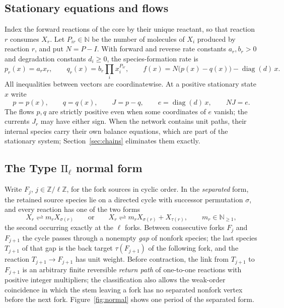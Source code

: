\documentclass[11pt,a4paper]{article}
\theoremstyle{plain}
\theoremstyle{definition}
\theoremstyle{remark}
\numberwithin{equation}{section}
\newcommand{\N}{\mathbb{N}}
\newcommand{\Z}{\mathbb{Z}}
\newcommand{\diag}{\operatorname{diag}}
\newcommand{\II}{\mathrm{II}}
\begin{document}
\subsection{Stationary equations and flows}
Index the forward reactions of the core by their unique reactant, so that reaction $r$ consumes $X_r$. Let $P_{ir}\in\N$ be the number of molecules of $X_i$ produced by reaction $r$, and put $N=P-I$. With forward and reverse rate constants $a_r,b_r>0$ and degradation constants $d_i\ge0$, the species-formation rate is
\begin{equation}\label{eq:model}
p_r(x)=a_rx_r,\qquad q_r(x)=b_r\prod_ix_i^{P_{ir}},\qquad
f(x)=N\bigl(p(x)-q(x)\bigr)-\diag(d)\,x .
\end{equation}
All inequalities between vectors are coordinatewise. At a positive stationary state $x$ write
\begin{equation}\label{eq:flows}
p=p(x),\qquad q=q(x),\qquad J=p-q,\qquad e=\diag(d)\,x,\qquad NJ=e .
\end{equation}
The flows $p,q$ are strictly positive even when some coordinates of $e$ vanish; the currents $J_r$ may have either sign. When the network contains unit paths, their internal species carry their own balance equations, which are part of the stationary system; Section~\ref{sec:chains} eliminates them exactly.

\subsection{The Type \texorpdfstring{$\II_\ell$}{II\_l} normal form}\label{subsec:typeii}
Write $F_j$, $j\in\Z/\ell\Z$, for the fork sources in cyclic order. In the \emph{separated} form, the retained source species lie on a directed cycle with successor permutation $\sigma$, and every reaction has one of the two forms
\begin{equation}\label{eq:ii}
X_r\rightleftharpoons m_rX_{\sigma(r)}
\qquad\text{or}\qquad
X_r\rightleftharpoons m_rX_{\sigma(r)}+X_{\tau(r)},\qquad m_r\in\N_{\ge1},
\end{equation}
the second occurring exactly at the $\ell$ forks. Between consecutive forks $F_j$ and $F_{j+1}$ the cycle passes through a nonempty \emph{gap} of nonfork species; the last species $T_{j+1}$ of that gap is the back target $\tau(F_{j+1})$ of the following fork, and the reaction $T_{j+1}\to F_{j+1}$ has unit weight. Before contraction, the link from $T_{j+1}$ to $F_{j+1}$ is an arbitrary finite reversible \emph{return path} of one-to-one reactions with positive integer multipliers; the classification also allows the weak-order coincidence in which the stem leaving a fork has no separated nonfork vertex before the next fork. Figure~\ref{fig:normal} shows one period of the separated form.
\end{document}
